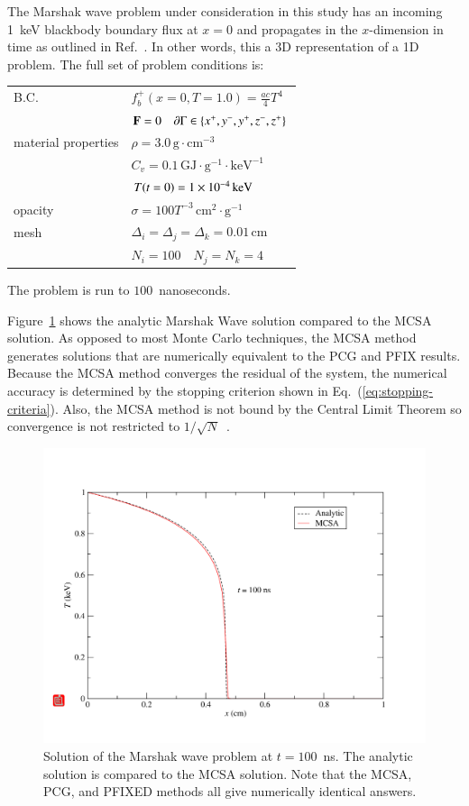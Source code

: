 \documentclass[preprint,12pt]{elsarticle}
\newcommand{\Cv}{\ensuremath{C_{v}}}
\newcommand{\Di}{\ensuremath{\Delta_i}}
\newcommand{\Dj}{\ensuremath{\Delta_j}}
\newcommand{\Dk}{\ensuremath{\Delta_k}}
\begin{document}
The Marshak wave problem under consideration in this study has an incoming
1~keV blackbody boundary flux at $x=0$ and propagates in the $x$-dimension in
time as outlined in Ref.~\cite{larsen_1980}.  In other words, this a 3D
representation of a 1D problem.  The full set of problem conditions is:
\begin{center}
  \begin{tabular}{ll}\hline
    B.C. & $f_b^{+}(x=0,T=1.0) = \frac{ac}{4}T^4$ \\ & $\mathbf{F} =
    0\quad \partial\Gamma \in \{x^{+}, y^{-}, y^{+}, z^{-}, z^{+}\}$
    \\ material properties & $\rho =
    3.0\,\text{g}\cdot\text{cm}^{-3}$ \\ & $\Cv =
    0.1\,\text{GJ}\cdot\text{g}^{-1}\cdot\text{keV}^{-1}$\\ &
    $T(t=0) = 1\times 10^{-4}\,\text{keV}$\\  opacity & $\sigma =
    100T^{-3}\,\text{cm}^2\cdot\text{g}^{-1}$ \\  mesh & $\Di = \Dj
    = \Dk = 0.01\,\text{cm}$ \\ & $N_i = 100\quad N_j = N_k = 4$
    \\ \hline
  \end{tabular}
\end{center}
The problem is run to $100$~nanoseconds.

Figure~\ref{fig:marshak_10} shows the analytic Marshak Wave solution compared
to the MCSA solution.  As opposed to most Monte Carlo techniques, the MCSA
method generates solutions that are numerically equivalent to the PCG and PFIX
results.  Because the MCSA method converges the residual of the system, the
numerical accuracy is determined by the stopping criterion shown in
Eq.~(\ref{eq:stopping-criteria}).  Also, the MCSA method is not bound by the
Central Limit Theorem so convergence is not restricted to
$1/\sqrt{N}$~\cite{halton_1994,evans_2003}.
\begin{figure}[h!]
  \centerline{ \includegraphics[width=5in,clip]{marshak_10.pdf}}
  \caption{ Solution of the Marshak wave problem at $t=100$~ns.  The
    analytic solution is compared to the MCSA solution.  Note that the
    MCSA, PCG, and PFIXED methods all give numerically identical
    answers.}
  \label{fig:marshak_10}
\end{figure}
\end{document}
